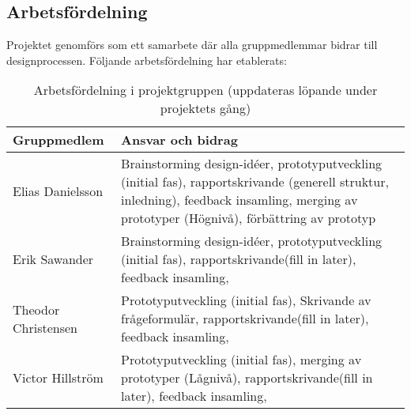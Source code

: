 \subsection{Arbetsfördelning}

Projektet genomförs som ett samarbete där alla gruppmedlemmar bidrar till designprocessen. Följande arbetsfördelning har etablerats:

\begin{table}[h]
\centering
\begin{tabular}{|l|p{9cm}|}
\hline
\textbf{Gruppmedlem} & \textbf{Ansvar och bidrag} \\
\hline
Elias Danielsson & Brainstorming design-idéer, prototyputveckling (initial fas), rapportskrivande (generell struktur, inledning), feedback insamling, merging av prototyper (Högnivå), förbättring av prototyp \\
\hline
Erik Sawander & Brainstorming design-idéer, prototyputveckling (initial fas), rapportskrivande(fill in later), feedback insamling, \\
\hline
Theodor Christensen & Prototyputveckling (initial fas), Skrivande av frågeformulär, rapportskrivande(fill in later), feedback insamling, \\
\hline
Victor Hillström & Prototyputveckling (initial fas), merging av prototyper (Lågnivå), rapportskrivande(fill in later), feedback insamling, \\
\hline
\end{tabular}
\caption{Arbetsfördelning i projektgruppen (uppdateras löpande under projektets gång)}
\end{table}
